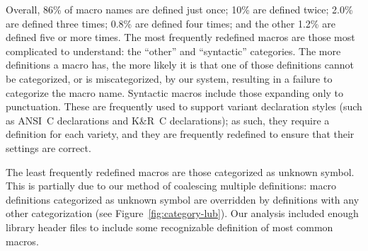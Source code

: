 \documentclass[10pt]{article}
\newcommand{\captionsmall}[1]{\caption[]{\small #1}}
\begin{document}


Overall, 86\% of macro names are defined just once; 10\% are defined twice;
2.0\% are defined three times; 0.8\% are defined four times; and the other
1.2\% are defined five or more times.
The most frequently redefined macros are those most complicated to
understand: the ``other'' and ``syntactic'' categories.  The more
definitions a macro has, the more likely it is that one of those
definitions cannot be categorized, or is miscategorized, by our system,
resulting in a failure to categorize the macro name.  Syntactic macros
include those expanding only to punctuation.  These are frequently used to
support variant declaration styles (such as ANSI~C declarations and K\&R~C
declarations); as such, they require a definition for each variety, and
they are frequently redefined to ensure that their
settings are correct.


The least frequently redefined macros are those categorized as unknown
symbol.  This is partially due to our method of coalescing multiple
definitions:  macro definitions categorized as unknown symbol are overridden
by definitions with any other categorization (see
Figure~\ref{fig:category-lub}).  Our
analysis included enough library header files to include some
recognizable definition of most common macros.
\end{document}
